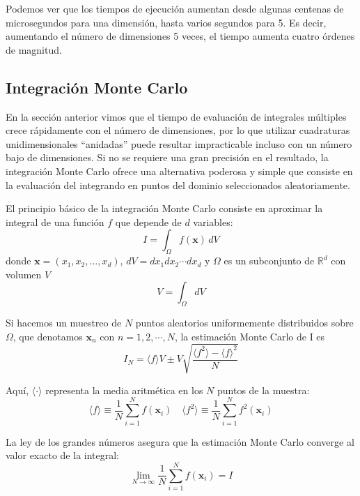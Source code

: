 Podemos ver que los tiempos de ejecución aumentan desde algunas centenas de microsegundos para una dimensión, hasta varios segundos para 5. Es decir, aumentando el número de dimensiones 5 veces, el tiempo aumenta cuatro órdenes de magnitud. 



\subsection{Integración Monte Carlo}
En la sección anterior vimos que el tiempo de evaluación de integrales múltiples crece rápidamente con el número de dimensiones, por lo que utilizar cuadraturas unidimensionales ``anidadas'' puede resultar impracticable incluso con un número bajo de dimensiones. Si no se requiere una gran precisión en el resultado, la integración Monte Carlo ofrece una alternativa poderosa y simple que consiste en la evaluación del integrando en puntos del dominio seleccionados aleatoriamente. 

El principio básico de la integración Monte Carlo consiste en aproximar la integral de una función $f$ que depende de $d$ variables:
\begin{equation}\label{eq:intmc01}
 I = \int_{\Omega} f(\bm{x}) \, dV
\end{equation} 
donde $\bm{x} = (x_1, x_2, \ldots, x_d)$, $dV = dx_1 dx_2 \cdots dx_d$ y $\Omega$ es un subconjunto de $\mathbb{R}^d$ con volumen $V$
\[ V = \int_{\Omega} dV \]

Si hacemos un muestreo de $N$ puntos aleatorios uniformemente distribuidos sobre $\Omega$, que denotamos $\bm{x}_n$ con $n = 1, 2, \cdots, N$, la estimación Monte Carlo de I es
\begin{equation}\label{eq:intmc02}
 I_N = \langle f \rangle V \pm V \sqrt{ \frac{\langle f^2 \rangle - \langle f \rangle^2}{N}}
\end{equation} 

Aquí, $\langle \cdot \rangle$ representa la media aritmética en los $N$ puntos de la muestra:
\begin{equation}\label{eq:intmc03}
 \langle f \rangle \equiv \frac{1}{N} \sum_{i=1}^{N} f(\bm{x}_i) \quad \langle f^2 \rangle \equiv \frac{1}{N} \sum_{i=1}^{N} f^2(\bm{x}_i)
\end{equation} 

La ley de los grandes números asegura que la estimación Monte Carlo converge al valor exacto de la integral:
\[ \lim_{N\rightarrow \infty} \frac{1}{N} \sum_{i=1}^{N} f(\bm{x}_i) = I \]

